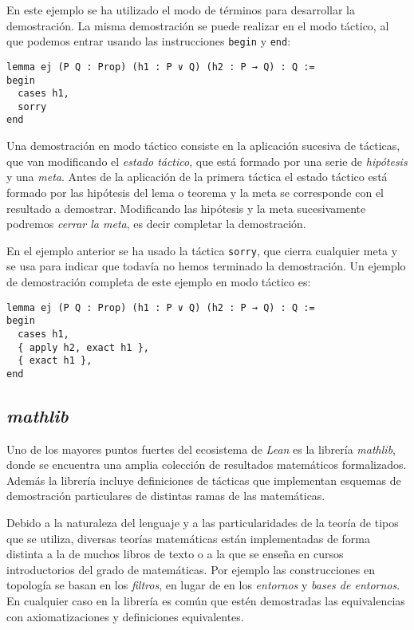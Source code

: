 En este ejemplo se ha utilizado el modo de términos para desarrollar la
demostración. La misma demostración se puede realizar en el modo táctico, al que
podemos entrar usando las instrucciones \lstinline{begin} y \lstinline{end}:

\begin{lstlisting}
lemma ej (P Q : Prop) (h1 : P ∨ Q) (h2 : P → Q) : Q :=
begin
  cases h1,
  sorry
end
\end{lstlisting}

Una demostración en modo táctico consiste en la aplicación sucesiva de tácticas,
que van modificando el \textit{estado táctico}, que está formado por una serie
de \textit{hipótesis} y una \textit{meta}. Antes de la aplicación de la primera
táctica el estado táctico está formado por las hipótesis del lema o teorema y la
meta se corresponde con el resultado a demostrar. Modificando las hipótesis y la
meta sucesivamente podremos \textit{cerrar la meta}, es decir completar la
demostración.

En el ejemplo anterior se ha usado la táctica \lstinline{sorry}, que cierra
cualquier meta y se usa para indicar que todavía no hemos terminado la
demostración. Un ejemplo de demostración completa de este ejemplo en modo
táctico es:

\begin{lstlisting}
lemma ej (P Q : Prop) (h1 : P ∨ Q) (h2 : P → Q) : Q :=
begin
  cases h1,
  { apply h2, exact h1 },
  { exact h1 },
end
\end{lstlisting}

\subsection{\textit{mathlib}}

Uno de los mayores puntos fuertes del ecosistema de \textit{Lean} es la librería
\textit{mathlib}, donde se encuentra una amplia colección de resultados
matemáticos formalizados. Además la librería incluye definiciones de tácticas
que implementan esquemas de demostración particulares de distintas ramas de las
matemáticas.

Debido a la naturaleza del lenguaje y a las particularidades de la teoría de
tipos que se utiliza, diversas teorías matemáticas están implementadas de forma
distinta a la de muchos libros de texto o a la que se enseña en cursos introductorios
del grado de matemáticas. Por ejemplo las construcciones en topología se
basan en los \textit{filtros}, en lugar de en los \textit{entornos} y
\textit{bases de entornos}. En cualquier caso en la librería es común que estén
demostradas las equivalencias con axiomatizaciones y definiciones equivalentes.



